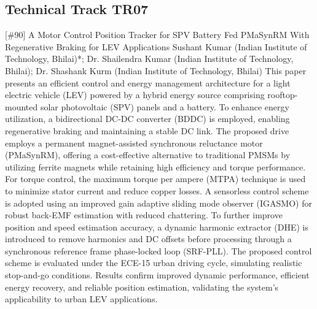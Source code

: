\clearpage \subsection{Technical Track TR07}\nopagebreak {} \begin{abstract_online} {[\#90] A Motor Control Position Tracker for SPV Battery Fed PMaSynRM With Regenerative Braking for LEV Applications } {} {Sushant Kumar (Indian Institute of Technology, Bhilai)*; Dr. Shailendra  Kumar (Indian Institute of Technology, Bhilai); Dr. Shashank Kurm (Indian Institute of Technology, Bhilai)} {} This paper presents an efficient control and energy management architecture for a light electric vehicle (LEV) powered by a hybrid energy source comprising rooftop-mounted solar photovoltaic (SPV) panels and a battery. To enhance energy utilization, a bidirectional DC-DC converter (BDDC) is employed, enabling regenerative braking and maintaining a stable DC link. The proposed drive employs a permanent magnet-assisted synchronous reluctance motor (PMaSynRM), offering a cost-effective alternative to traditional PMSMs by utilizing ferrite magnets while retaining high efficiency and torque performance. For torque control, the maximum torque per ampere (MTPA) technique is used to minimize stator current and reduce copper losses. A sensorless control scheme is adopted using an improved gain adaptive sliding mode observer (IGASMO) for robust back-EMF estimation with reduced chattering. To further improve position and speed estimation accuracy, a dynamic harmonic extractor (DHE) is introduced to remove harmonics and DC offsets before processing through a synchronous reference frame phase-locked loop (SRF-PLL). The proposed control scheme is evaluated under the ECE-15 urban driving cycle, simulating realistic stop-and-go conditions. Results confirm improved dynamic performance, efficient energy recovery, and reliable position estimation, validating the system's applicability to urban LEV applications. \end{abstract_online} 
